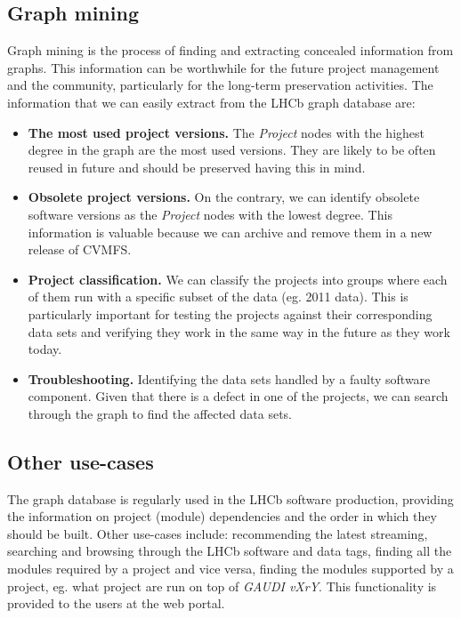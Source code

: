 \subsection{Graph mining}

Graph mining is the process of finding and extracting concealed information from graphs. This information can be worthwhile for the future project management and the community, particularly for the long-term preservation activities. The information that we can easily extract from the LHCb graph database are:
\begin{itemize}
    \item {\bf The most used project versions.} The \emph{Project} nodes with the highest degree in the graph are the most used versions. They are likely to be often reused in future and should be preserved having this in mind.
    \item {\bf Obsolete project versions.} On the contrary, we can identify obsolete software versions as the \emph{Project} nodes with the lowest degree. This information is valuable because we can archive and remove them in a new release of CVMFS.
    \item {\bf Project classification.} We can classify the projects into groups where each of them run with a specific subset of the data (eg. 2011 data). This is particularly important for testing the projects against their corresponding data sets and verifying they work in the same way in the future as they work today.
    \item {\bf Troubleshooting.} Identifying the data sets handled by a faulty software component. Given that there is a defect in one of the projects, we can search through the graph to find the affected data sets.
\end{itemize}

\subsection{Other use-cases}

The graph database is regularly used in the LHCb software production, providing the information on project (module) dependencies and the order in which they should be built. Other use-cases include: recommending the latest streaming, searching and browsing through the LHCb software and data tags, finding all the modules required by a project and vice versa, finding the modules supported by a project, eg. what project are run on top of \emph{GAUDI vXrY}. This functionality is provided to the users at the web portal.
